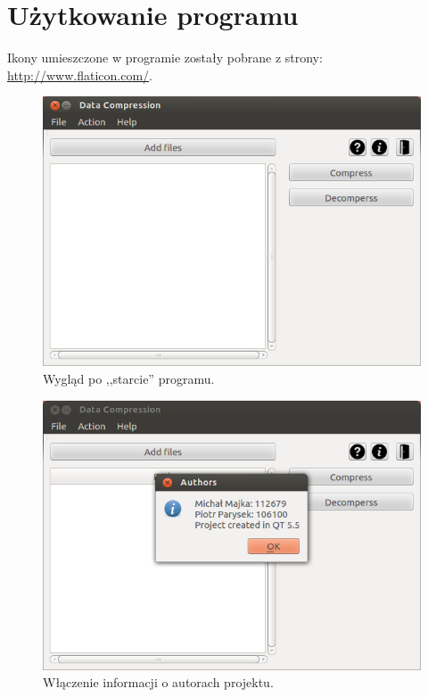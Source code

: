\documentclass[12pt,a4paper,notitlepage]{report}
\begin{document}
\section{Użytkowanie programu}
Ikony umieszczone w programie zostały pobrane z strony: \url{http://www.flaticon.com/}\cite{ikony}.
\renewcommand{\figurename}{Zrzut ekranu} %
\begin{figure}[H]
	\setcounter{figure}{0} %
	\centering
	\includegraphics[scale=.7]{start}
	\caption{Wygląd po ,,starcie'' programu.}
\end{figure}
\begin{figure}[H]
	\centering
	\includegraphics[scale=.7]{info}
	\caption{Włączenie informacji o autorach projektu.}
\end{figure}
\end{document}
